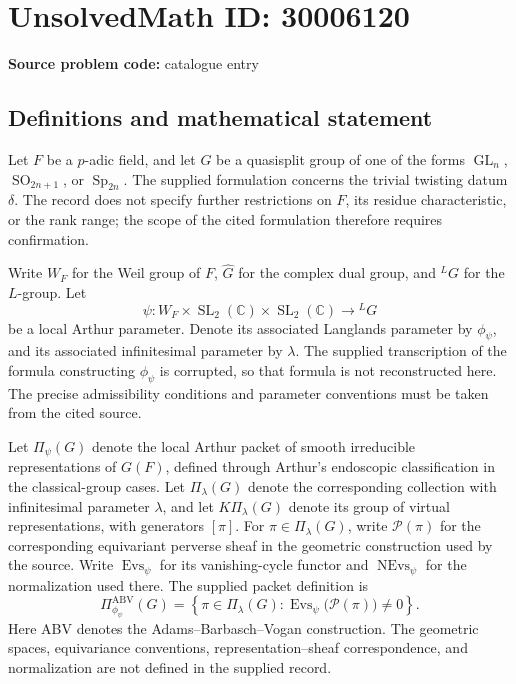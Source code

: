 \documentclass[11pt]{article}
\newcommand{\C}{\mathbb{C}}
\begin{document}
\section*{UnsolvedMath ID: 30006120}
\textbf{Source problem code:} catalogue entry
\subsection{Definitions and mathematical statement}
Let \(F\) be a \(p\)-adic field, and let \(G\) be a quasisplit group of one of the forms \(\operatorname{GL}_n\), \(\operatorname{SO}_{2n+1}\), or \(\operatorname{Sp}_{2n}\). The supplied formulation concerns the trivial twisting datum \(\delta\). The record does not specify further restrictions on \(F\), its residue characteristic, or the rank range; the scope of the cited formulation therefore requires confirmation.

Write \(W_F\) for the Weil group of \(F\), \(\widehat G\) for the complex dual group, and \({}^{L}G\) for the \(L\)-group. Let
\[
\psi:W_F\times\operatorname{SL}_2(\C)\times\operatorname{SL}_2(\C)\longrightarrow{}^{L}G
\]
be a local Arthur parameter. Denote its associated Langlands parameter by \(\phi_\psi\), and its associated infinitesimal parameter by \(\lambda\). The supplied transcription of the formula constructing \(\phi_\psi\) is corrupted, so that formula is not reconstructed here. The precise admissibility conditions and parameter conventions must be taken from the cited source.

Let \(\Pi_\psi(G)\) denote the local Arthur packet of smooth irreducible representations of \(G(F)\), defined through Arthur's endoscopic classification in the classical-group cases. Let \(\Pi_\lambda(G)\) denote the corresponding collection with infinitesimal parameter \(\lambda\), and let \(K\Pi_\lambda(G)\) denote its group of virtual representations, with generators \([\pi]\). For \(\pi\in\Pi_\lambda(G)\), write \(\mathcal P(\pi)\) for the corresponding equivariant perverse sheaf in the geometric construction used by the source. Write \(\operatorname{Evs}_\psi\) for its vanishing-cycle functor and \(\operatorname{NEvs}_\psi\) for the normalization used there. The supplied packet definition is
\[
\Pi^{\mathrm{ABV}}_{\phi_\psi}(G)
=
\left\{\pi\in\Pi_\lambda(G):
\operatorname{Evs}_\psi\bigl(\mathcal P(\pi)\bigr)\ne0\right\}.
\]
Here ABV denotes the Adams--Barbasch--Vogan construction. The geometric spaces, equivariance conventions, representation--sheaf correspondence, and normalization are not defined in the supplied record.
\end{document}
